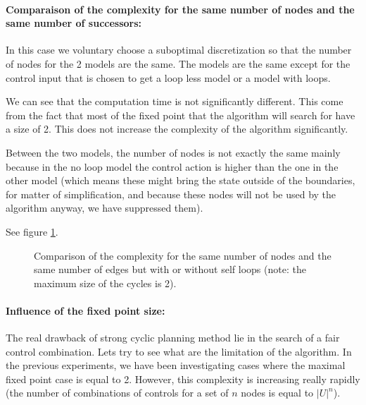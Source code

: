\documentclass{article}
\begin{document}
\paragraph{Comparaison of the complexity for the same number of nodes and the same number of successors:}
In this case we voluntary choose a suboptimal discretization so that the number of nodes for the 2 models are the same.
The models are the same except for the control input that is chosen to get a loop less model or a model with loops.

We can see that the computation time is not significantly different.
This come from the fact that most of the fixed point that the algorithm will search for have a size of 2.
This does not increase the complexity of the algorithm significantly.

Between the two models, the number of nodes is not exactly the same mainly because in the no loop model the control action is higher than the one in the other model (which means these might bring the state outside of the boundaries, for matter of simplification, and because these nodes will not be used by the algorithm anyway, we have suppressed them).

See figure \ref{fig:same_nbre_nodes}.

\datasamenode

\begin{figure}
\center
{}
\caption{Comparison of the complexity for the same number of nodes and the same number of edges but with or without self loops (note: the maximum size of the cycles is 2).}
\label{fig:same_nbre_nodes}
\end{figure}

\paragraph{Influence of the fixed point size:}
The real drawback of strong cyclic planning method lie in the search of a fair control combination. Lets try to see what are the limitation of the algorithm.
In the previous experiments, we have been investigating cases where the maximal fixed point case is equal to 2. However, this complexity is increasing really rapidly (the number of combinations of controls for a set of $n$ nodes is equal to $|U|^n$).
\end{document}

